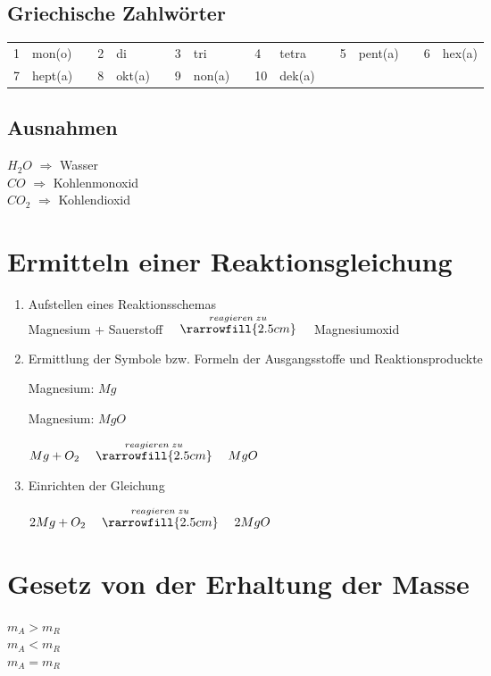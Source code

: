 \subsection{Griechische Zahlwörter}
\begin{tabular}{llcllcllcllcllcll}
1 & mon(o) & & 2 & di & & 3 & tri & & 4 & tetra & & 5 & pent(a) & & 6 & hex(a) \\
7 & hept(a) & & 8 & okt(a) & & 9 & non(a) & & 10 & dek(a)
\end{tabular}

\subsection{Ausnahmen}
$H_2O$ $\Rightarrow$ Wasser \\
$CO$ $\Rightarrow$ Kohlenmonoxid \\
$CO_2$ $\Rightarrow$ Kohlendioxid

\section{Ermitteln einer Reaktionsgleichung}
\begin{enumerate}
\item Aufstellen eines Reaktionsschemas\\
Magnesium + Sauerstoff $\quad\stackrel{reagieren\;zu}{\rarrowfill{2.5cm}}\quad$ Magnesiumoxid
\item Ermittlung der Symbole bzw. Formeln der Ausgangsstoffe und Reaktionsproduckte

Magnesium: $Mg$

Magnesium: $MgO$



$Mg + O_2 \quad\stackrel{reagieren\;zu}{\rarrowfill{2.5cm}}\quad MgO$
\item Einrichten der Gleichung

$2Mg + O_2 \quad\stackrel{reagieren\;zu}{\rarrowfill{2.5cm}}\quad 2MgO $
\end{enumerate}
\section{Gesetz von der Erhaltung der Masse}
$m_A> m_R$\\
$m_A< m_R$\\
$m_A=m_R$

